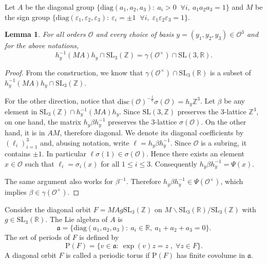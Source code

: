 \documentclass[11pt,letterpaper]{amsart}
\newtheorem{lem}[theorem]{Lemma}
\theoremstyle{definition}
\theoremstyle{remark}
\renewcommand{\rm}[1]{\mathrm{#1}}
\newcommand{\cal}[1]{\mathcal{#1}}
\newcommand{\bb}[1]{\mathbb{#1}}
\renewcommand{\frak}[1]{\mathfrak{#1}}
\newcommand{\R}{\bb R}
\newcommand{\Z}{\bb Z}
\newcommand{\calO}{\cal O}
\newcommand{\diag}{\mathrm{diag}}
\newcommand{\SL}{\rm{SL}}
\begin{document}
	Let $A$ be the diagonal group $\{\diag(a_1,a_2,a_3):\ a_i>0 \;\; \forall i ,\ a_1a_2a_3=1\}$ and $M$ be the sign group $\{\diag(\varepsilon_1,\varepsilon_2,\varepsilon_3):\ \varepsilon_i=\pm 1 \;\; \forall i, \; \varepsilon_1\varepsilon_2\varepsilon_3=1\}$.
	\begin{lem}\label{lem:order-gamma}
		For all orders $\calO$ and every choice of basis $y=(y_1,y_2,y_3) \in \calO^3$ and for the above notations,
		$$h_y^{-1}(MA)h_y\cap \SL_3(\Z)=\gamma(\calO^\times)\cap \SL(3,\R).$$
	\end{lem}
	\begin{proof}
		From the construction, we know that $\gamma(\calO^\times)\cap\SL_3(\R)$ is a subset of $h_y^{-1}(MA)h_y\cap \SL_3(\Z) $.
		
		For the other direction, notice that $ \mathrm{disc}(\mathcal{O})^{-\frac{1}{6}}\sigma(\calO)=h_y\Z^3$.
		Let $\beta$ be any element in $\SL_3(\Z)\cap h_y^{-1}(MA)h_y$.
		Since $\SL(3,\Z)$ preserves the $3$-lattice $\Z^3$, on one hand,
		the matrix $h_y\beta h_y^{-1}$ preserves the $3$-lattice $\sigma(\calO)$.
		On the other hand, it is in $AM$, therefore diagonal.
		We denote its diagonal coefficients by $(\ell_i)_{i=1}^3$ and, abusing notation, write $\ell = h_y\beta h_y^{-1}$.
		Since $\calO$ is a subring, it contains $\pm 1$. 
		In particular $\ell \sigma(1)\in\sigma(\calO)$. 
		Hence there exists an element $x\in\calO$ such that $\ell_i =\sigma_i(x)$ for all $1 \leq i \leq 3$. 
		Consequently $h_y\beta h_y^{-1}=\Psi(x)$. 
		
		The same argument also works for $\beta^{-1}$. Therefore $h_y\beta h_y^{-1}\in \Psi(\calO^\times) $, which implies $\beta\in \gamma(\calO^\times)$.
	\end{proof}	
		Consider the diagonal orbit $F=MAg\SL_3(\Z)$ on $M\backslash\SL_3(\R)/\SL_3(\Z)$ with $g\in\SL_3(\R)$. The Lie algebra of $A$ is
		\begin{equation}
			\label{eq:lie-algebra-A}
			\frak a=\{\diag(a_1,a_2,a_3):\ a_i\in\R,\ a_1+a_2+a_3=0 \}.
		\end{equation}
		The set of periods of $F$ is defined by
	\[\mathrm{P}(F)=\{v\in \frak a:\ \exp(v)z=z \; , \; \forall z \in F \}.  \]
	A diagonal orbit $F$ is called a periodic torus if $\mathrm{P}(F)$ has finite covolume in $\frak a$.
	
\end{document}
